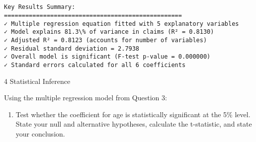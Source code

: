 \documentclass[8pt, twocolumn]{extarticle}
\providecommand{\tightlist}{%
      \setlength{\itemsep}{0pt}\setlength{\parskip}{0pt}}
\begin{document}
    \begin{center}
    \end{center}
    { \hspace*{\fill} \\}
    
    \begin{Verbatim}[commandchars=\\\{\}]

Key Results Summary:
==================================================
✓ Multiple regression equation fitted with 5 explanatory variables
✓ Model explains 81.3\% of variance in claims (R² = 0.8130)
✓ Adjusted R² = 0.8123 (accounts for number of variables)
✓ Residual standard deviation = 2.7938
✓ Overall model is significant (F-test p-value = 0.000000)
✓ Standard errors calculated for all 6 coefficients
    \end{Verbatim}

    4 Statistical Inference

Using the multiple regression model from Question 3:

    \begin{enumerate}
\def\labelenumi{(\alph{enumi})}
\tightlist
\item
  Test whether the coefficient for age is statistically significant at
  the 5\% level. State your null and alternative hypotheses, calculate
  the t-statistic, and state your conclusion.
\end{enumerate}
\end{document}
